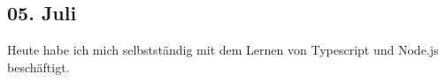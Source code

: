 \subsection{05. Juli}
Heute habe ich mich selbstständig mit dem Lernen von Typescript und Node.js beschäftigt.